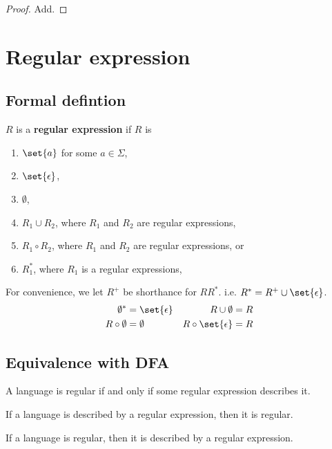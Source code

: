 \begin{proof}
    Add.
\end{proof}
\section{Regular expression}
\subsection{Formal defintion}
\begin{definition}
    \(R\) is a \textbf{regular expression} if \(R\) is 
    \begin{enumerate}
        \item \(\set{a}\) for some \(a \in \Sigma\),
        \item \(\set{\epsilon}\),
        \item \(\emptyset\),
        \item \(R_1 \cup R_2\), where \(R_1\) and \(R_2\) are regular expressions,
        \item \(R_1 \circ R_2\), where \(R_1\) and \(R_2\) are regular expressions, or
        \item \(R_1^{\ast}\), where \(R_1\) is a regular expressions,
    \end{enumerate}
\end{definition}
For convenience, we let \(R^+\) be shorthance for \(RR^{\ast}\). i.e. \(R^{\ast} = R^{+} \cup \set{\epsilon}\).
\begin{align*}
    \emptyset^{\ast} &= \set{\epsilon}& R \cup \emptyset &= R \\
    R \circ \emptyset &=  \emptyset & R \circ \set{\epsilon} &= R 
\end{align*}

\subsection{Equivalence with DFA}

\begin{theorem}
    A language is regular if and only if some regular expression describes it.
\end{theorem}

\begin{lemma}
    If a language is described by a regular expression, then it is regular.
\end{lemma}

\begin{lemma}
    If a language is regular, then it is described by a regular expression.
\end{lemma}

